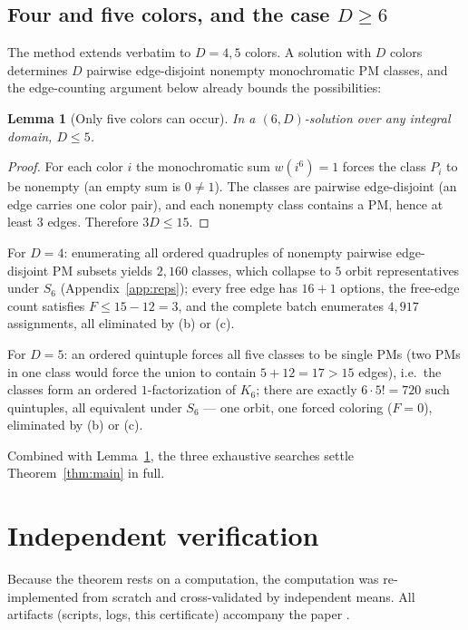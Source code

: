 \documentclass[11pt]{article}
\newtheorem{lemma}[theorem]{Lemma}
\theoremstyle{definition}
\begin{document}
\subsection{Four and five colors, and the case $D\ge 6$}

The method extends verbatim to $D=4,5$ colors. A solution with $D$
colors determines $D$ pairwise edge-disjoint nonempty monochromatic PM
classes, and the edge-counting argument below already bounds the
possibilities:

\begin{lemma}[Only five colors can occur]\label{lem:Dle5}
In a $(6,D)$-solution over any integral domain, $D\le 5$.
\end{lemma}
\begin{proof}
For each color $i$ the monochromatic sum $w(i^6)=1$ forces the class
$P_i$ to be nonempty (an empty sum is $0\neq 1$). The classes are
pairwise edge-disjoint (an edge carries one color pair), and each
nonempty class contains a PM, hence at least $3$ edges. Therefore
$3D\le 15$.
\end{proof}

For $D=4$: enumerating all ordered quadruples of nonempty pairwise
edge-disjoint PM subsets yields $2{,}160$ classes, which collapse to
$5$ orbit representatives under $S_6$ (Appendix~\ref{app:reps}); every
free edge has $16+1$ options, the free-edge count satisfies
$F\le 15-12=3$, and the complete batch enumerates
$4{,}917$ assignments, all eliminated by (b) or (c).

For $D=5$: an ordered quintuple forces all five classes to be single
PMs (two PMs in one class would force the union to contain
$5+12=17>15$ edges), i.e.\ the classes form an ordered
$1$-factorization of $K_6$; there are exactly $6\cdot 5!=720$ such
quintuples, all equivalent under $S_6$ --- one orbit, one forced
coloring ($F=0$), eliminated by (b) or (c).

Combined with Lemma~\ref{lem:Dle5}, the three exhaustive searches settle
Theorem~\ref{thm:main} in full.

\section{Independent verification}\label{sec:verify}

Because the theorem rests on a computation, the computation was
re-implemented from scratch and cross-validated by independent means.
All artifacts (scripts, logs, this certificate) accompany the paper
\cite{repo}.
\end{document}
